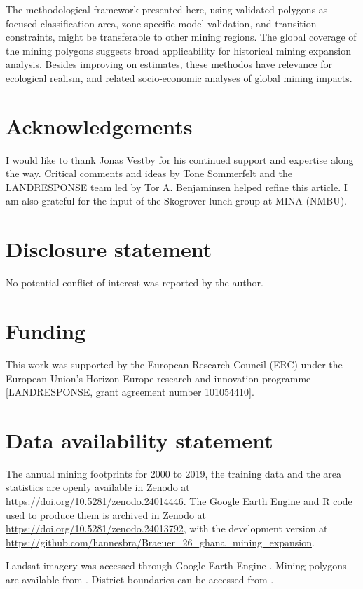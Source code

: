 \documentclass[]{interact}
\begin{document}
The methodological framework presented here, using validated polygons as focused classification area, zone-specific model validation, and transition constraints, might be transferable to other mining regions. The global coverage of the \citet{maus2022update} mining polygons suggests broad applicability for historical mining expansion analysis. Besides improving on estimates, these methodos have relevance for ecological realism, and related socio-economic analyses of global mining impacts.

\section*{Acknowledgements}
I would like to thank Jonas Vestby for his continued support and expertise
along the way. Critical comments and ideas by Tone Sommerfelt and the
LANDRESPONSE team led by Tor A. Benjaminsen helped refine this article.
I am also grateful for the input of the Skogrover lunch group at MINA (NMBU).

\section*{Disclosure statement}
No potential conflict of interest was reported by the author.

\section*{Funding}
This work was supported by the European Research Council (ERC) under the
European Union's Horizon Europe research and innovation programme
[LANDRESPONSE, grant agreement number 101054410].

\section*{Data availability statement}
The annual mining footprints for 2000 to 2019, the training data and the
area statistics are openly
available in Zenodo at \url{https://doi.org/10.5281/zenodo.24014446}.
The Google Earth Engine and R code used to produce them is archived in
Zenodo at \url{https://doi.org/10.5281/zenodo.24013792}, with the
development version at
\url{https://github.com/hannesbra/Braeuer_26_ghana_mining_expansion}.

Landsat imagery was accessed through Google Earth Engine
\citep{gorelick2017Google}. Mining polygons are available from
\citet{maus2022update}. District boundaries can be accessed from
\citet{ruggles2025Integrated}.
\end{document}
